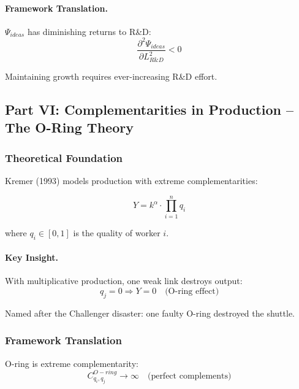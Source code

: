 \paragraph{Framework Translation.}
$\Psi_{ideas}$ has diminishing returns to R\&D:
\begin{equation}
\frac{\partial^2 \Psi_{ideas}}{\partial L_{R\&D}^2} < 0
\end{equation}

Maintaining growth requires ever-increasing R\&D effort.

\subsection{Part VI: Complementarities in Production – The O-Ring Theory}

\subsubsection{Theoretical Foundation}

Kremer (1993) models production with extreme complementarities:

\begin{equation}
\boxed{
Y = k^\alpha \cdot \prod_{i=1}^n q_i
}
\label{eq:o-ring}
\end{equation}

where $q_i \in [0,1]$ is the quality of worker $i$.

\paragraph{Key Insight.}
With multiplicative production, one weak link destroys output:
\begin{equation}
q_j = 0 \Rightarrow Y = 0 \quad \text{(O-ring effect)}
\end{equation}

Named after the Challenger disaster: one faulty O-ring destroyed the shuttle.

\subsubsection{Framework Translation}

O-ring is extreme complementarity:
\begin{equation}
C_{q_i, q_j}^{O-ring} \to \infty \quad \text{(perfect complements)}
\end{equation}

